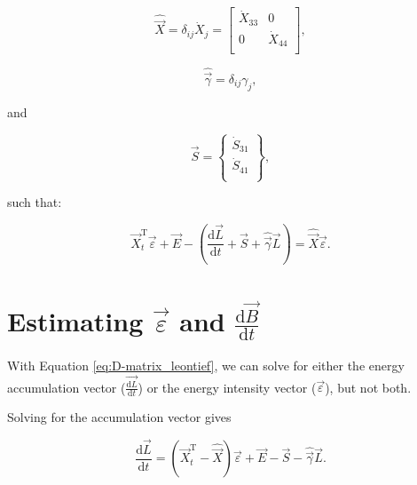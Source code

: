 \begin{equation} \label{eq:D-X_hat_matrix_def}
	\hat{\vec{X}} = \delta_{ij}\dot{X}_{j} = \begin{bmatrix} 	\dot{X}_{33}		&	0					\\
																								0					&	\dot{X}_{44}	\\
																							\end{bmatrix},
\end{equation}


\begin{equation} \label{eq:D-B_hat_matrix_def}
	\hat{\vec{\gamma}} = \delta_{ij}\gamma_{j},
\end{equation}

\noindent and

\begin{equation} \label{eq:D-S_vec_def}
	\vec{S} =		\begin{Bmatrix} 	\dot{S}_{31}	\\
													\dot{S}_{41}\\
						\end{Bmatrix},
\end{equation}

\noindent such that:

\begin{equation} \label{D-eq:matrix_leontief}
	\vec{X}_{t}^{\mathrm{T}}\vec{\varepsilon} + \vec{E} - \left(\frac{\mathrm{d}\vec{L}}{\mathrm{d}t} +\vec{S} + \hat{\vec{\gamma}}\vec{L}\right) = \hat{\vec{X}}\vec{\varepsilon}.
\end{equation}

\section{Estimating $\vec{\varepsilon}$ and $\frac{\mathrm{d}\vec{B}}{\mathrm{d}t}$}

With Equation \ref{eq:D-matrix_leontief}, we can solve for either the energy accumulation vector ($\vec{\frac{\mathrm{d}L}{\mathrm{d}t}}$) or the energy intensity vector ($\vec{\varepsilon}$), but not both. 

Solving for the accumulation vector gives

\begin{equation} \label{eq:D-dL_dt_leontief}
	\frac{\mathrm{d}\vec{L}}{\mathrm{d}t} = (\vec{X}_{t}^{\mathrm{T}} - \hat{\vec{X}})\vec{\varepsilon} + \vec{E} - \vec{S} - \hat{\vec{\gamma}}\vec{L}.
\end{equation}

